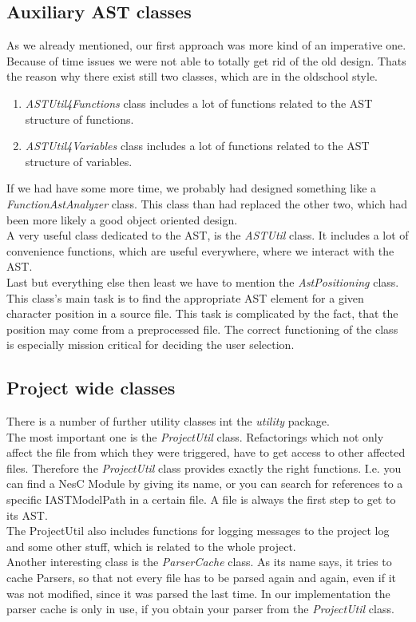\documentclass[a4paper,10pt]{report}
\begin{document}
\subsection{Auxiliary AST classes}
As we already mentioned, our first approach was more kind of an imperative one. Because of time issues we were not able to totally get rid of the old design. Thats the reason why there exist still two classes, which are in the oldschool style.
   \begin{enumerate}
     \item {\it ASTUtil4Functions} class includes a lot of functions related to the AST structure of functions.
     \item {\it ASTUtil4Variables} class includes a lot of functions related to the AST structure of variables.
   \end{enumerate}
If we had have some more time, we probably had designed something like a {\it FunctionAstAnalyzer} class. This class than had replaced the other two, which had been more likely a good object oriented design.\\
A very useful class dedicated to the AST, is the {\it ASTUtil} class. It includes a lot of convenience functions, which are useful everywhere, where we interact with the AST.\\
Last but everything else then least we have to mention the {\it AstPositioning} class. This class's main task is to find the appropriate AST element for a given character position in a source file.
This task is complicated by the fact, that the position may come from a preprocessed file. The correct functioning of the class is especially mission critical for deciding the user selection.

\subsection{Project wide classes}
There is a number of further utility classes int the {\it utility} package.\\
The most important one is the {\it ProjectUtil} class. Refactorings which not only affect the file from which they were triggered, have to get access to other affected files.
Therefore the {\it ProjectUtil} class provides exactly the right functions. I.e. you can find a NesC Module by giving its name, or you can search for references to a specific {IASTModelPath} in a certain file.
A file is always the first step to get to its AST.\\
The {ProjectUtil} also includes functions for logging messages to the project log and some other stuff, which is related to the whole project.\\
Another interesting class is the {\it ParserCache} class. As its name says, it tries to cache Parsers, so that not every file has to be parsed again and again, even if it was not modified, since it was parsed the last time. In our implementation the parser cache is only in use, if you obtain your parser from the {\it ProjectUtil} class. 
\end{document}
